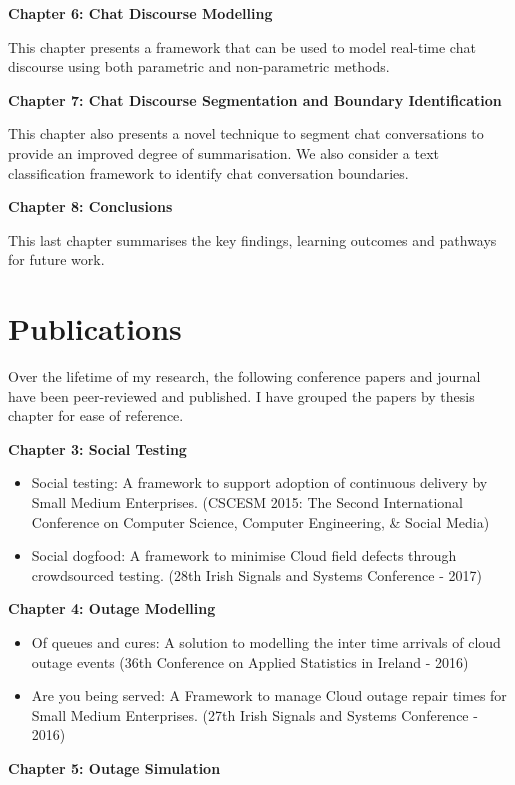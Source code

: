 \textbf{Chapter 6: Chat Discourse Modelling}

This chapter presents a framework that can be used to model real-time chat discourse using both parametric and non-parametric methods. 

\textbf{Chapter 7: Chat Discourse Segmentation and Boundary Identification}

This chapter also presents a novel technique to segment chat conversations to provide an improved degree of summarisation. We also consider a text classification framework to identify chat conversation boundaries. 

\textbf{Chapter 8: Conclusions}

This last chapter summarises the key findings, learning outcomes and pathways for future work.

\section{Publications} 

Over the lifetime of my research, the following conference papers and journal have been peer-reviewed and published. I have grouped the papers by thesis chapter for ease of reference.

\textbf{Chapter 3: Social Testing}
 
\begin{itemize}
  \item Social testing: A framework to support adoption of continuous delivery by Small Medium Enterprises. (CSCESM 2015: The Second International Conference on Computer Science, Computer Engineering, \& Social Media)
  \item Social dogfood: A framework to minimise Cloud field defects through crowdsourced testing. (28th Irish Signals and Systems Conference - 2017)
\end{itemize}


\textbf{Chapter 4: Outage Modelling}

\begin{itemize}
  \item Of queues and cures: A solution to modelling the inter time arrivals of cloud outage events (36th Conference on Applied Statistics in Ireland - 2016)
  \item Are you being served: A Framework to manage Cloud outage repair times for Small Medium Enterprises. (27th Irish Signals and Systems Conference - 2016)
\end{itemize}


\textbf{Chapter 5: Outage Simulation}

